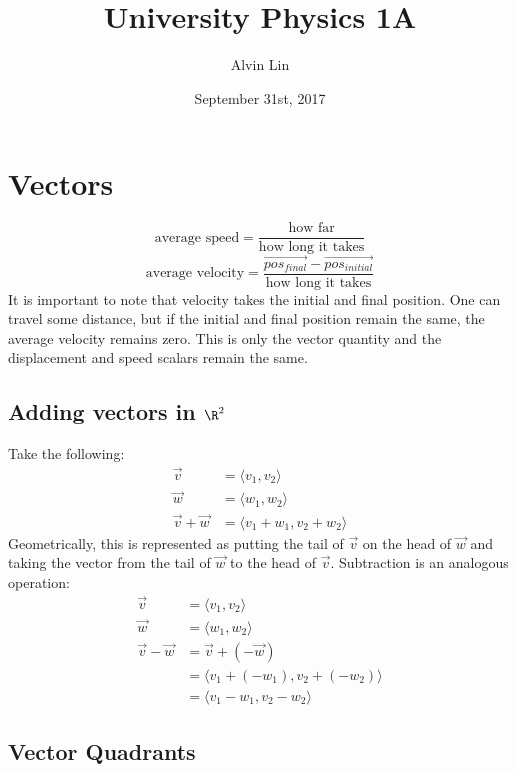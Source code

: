 \documentclass[letterpaper, 12pt]{math}
\title{University Physics 1A}
\author{Alvin Lin}
\date{September 31st, 2017}
\begin{document}
\maketitle

\section*{Vectors}
\[ \textrm{average speed} =
  \frac{\textrm{how far}}{\textrm{how long it takes}} \]
\[ \textrm{average velocity} =
  \frac{\vec{pos_{final}}-\vec{pos_{initial}}}
  {\textrm{how long it takes}} \]
It is important to note that velocity takes the initial and final
position. One can travel some distance, but if the initial and final
position remain the same, the average velocity remains zero. This is
only the vector quantity and the displacement and speed scalars remain
the same.

\subsection*{Adding vectors in \( \R^{2} \)}
Take the following:
\begin{align*}
  \vec{v} &= \langle v_{1},v_{2}\rangle \\
  \vec{w} &= \langle w_{1},w_{2}\rangle \\
  \vec{v}+\vec{w} &= \langle v_{1}+w_{1},v_{2}+w_{2}\rangle
\end{align*}
Geometrically, this is represented as putting the tail of
\( \vec{v} \) on the head of \( \vec{w} \) and taking the vector
from the tail of \( \vec{w} \) to the head of \( \vec{v} \).
Subtraction is an analogous operation:
\begin{align*}
  \vec{v} &= \langle v_{1},v_{2}\rangle \\
  \vec{w} &= \langle w_{1},w_{2}\rangle \\
  \vec{v}-\vec{w} &= \vec{v}+(-\vec{w}) \\
  &= \langle v_{1}+(-w_{1}),v_{2}+(-w_{2})\rangle \\
  &= \langle v_{1}-w_{1},v_{2}-w_{2}\rangle
\end{align*}

\subsection*{Vector Quadrants}
\begin{center}
\end{center}
\end{document}
